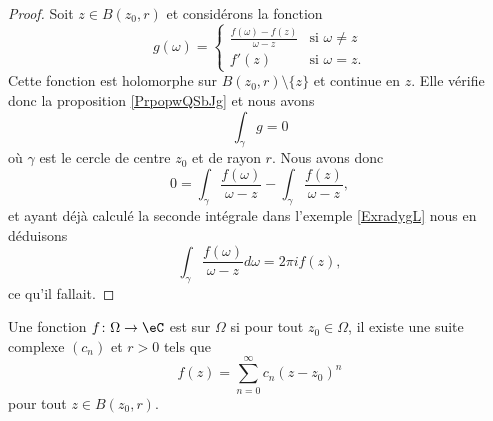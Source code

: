 \begin{proof}
    Soit \( z\in B(z_0,r)\) et considérons la fonction
    \begin{equation}
        g(\omega)=\begin{cases}
            \frac{ f(\omega)-f(z) }{ \omega-z }    &   \text{si } \omega\neq z\\
            f'(z)    &    \text{si } \omega=z.
        \end{cases}
    \end{equation}
    Cette fonction est holomorphe sur \( B(z_0,r)\setminus\{ z \}\) et continue en \( z\). Elle vérifie donc la proposition \ref{PrpopwQSbJg} et nous avons
    \begin{equation}
        \int_{\gamma}g=0
    \end{equation}
    où \( \gamma\) est le cercle de centre \( z_0\) et de rayon \( r\). Nous avons donc
    \begin{equation}
        0=\int_{\gamma}\frac{ f(\omega) }{ \omega-z }-\int_{\gamma}\frac{ f(z) }{ \omega-z },
    \end{equation}
    et ayant déjà calculé la seconde intégrale dans l'exemple \ref{ExradygL} nous en déduisons
    \begin{equation}
        \int_{\gamma}\frac{ f(\omega) }{ \omega-z }d\omega=2\pi if(z),
    \end{equation}
    ce qu'il fallait.
\end{proof}

\begin{definition}
    Une fonction \( f\colon \Omega\to \eC\) est  sur \( \Omega\) si pour tout \( z_0\in\Omega\), il existe une suite complexe \( (c_n)\) et \( r>0\) tels que
    \begin{equation}
        f(z)=\sum_{n=0}^{\infty} c_n(z-z_0)^n
    \end{equation}
    pour tout \( z\in B(z_0,r)\).
\end{definition}


